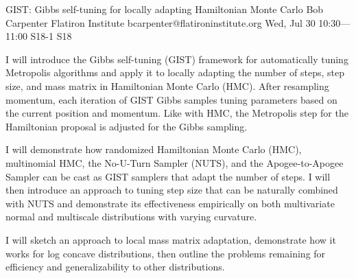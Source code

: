 \begin{talk}
  {GIST: Gibbs self-tuning for locally adapting Hamiltonian Monte Carlo}%
  {Bob Carpenter}%
  {Flatiron Institute}%
  {bcarpenter@flatironinstitute.org}%
  {}%
  {}%
  {Wed, Jul 30 10:30---11:00}%
  {S18-1}%
  {S18}%
  {}%
  
    
   
I will introduce the Gibbs self-tuning (GIST) framework for automatically tuning Metropolis algorithms and apply it to locally adapting the number of steps, step size, and mass matrix in Hamiltonian Monte Carlo (HMC).  After resampling momentum, each iteration of GIST Gibbs samples tuning parameters based on the current position and momentum.  Like with HMC, the Metropolis step for the Hamiltonian proposal is adjusted for the Gibbs sampling.

I will demonstrate how randomized Hamiltonian Monte Carlo (HMC), multinomial HMC, the No-U-Turn Sampler (NUTS), and the Apogee-to-Apogee Sampler can be cast as GIST samplers that adapt the number of steps.  I will then introduce an approach to tuning step size that can be naturally combined with NUTS and demonstrate its effectiveness empirically on both multivariate normal and multiscale distributions with varying curvature.  

I will sketch an approach to local mass matrix adaptation, demonstrate how it works for log concave distributions, then outline the problems remaining for efficiency and generalizability to other distributions.

\end{talk}


